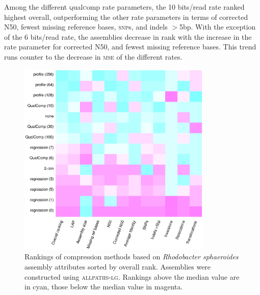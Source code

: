 \documentclass{bioinfo}
\begin{document}
Among the different \textsc{q}ual\textsc{c}omp rate parameters, the 10
bits/read rate ranked highest overall, outperforming the other rate
parameters in terms of corrected N50, fewest missing reference bases,
\textsc{snp}s, and indels $>$5bp. With the exception of the 6
bits/read rate, the assemblies decrease in rank with the increase in
the rate parameter for corrected N50, and fewest missing reference
bases. This trend runs counter to the decrease in \textsc{mse} of the
different rates.

\begin{figure}[!tbp]
\centerline{\includegraphics[width=3.65in]{rhodo_assembly_results.eps}}
\caption{Rankings of compression methods based on \textit{Rhodobacter
    sphaeroides} assembly attributes sorted by overall
  rank. Assemblies were constructed using \textsc{allpaths-lg}.
  Rankings above the median value are in cyan, those below the median
  value in magenta.}
  \label{fig:assembly_ranks}
\end{figure}
\end{document}
